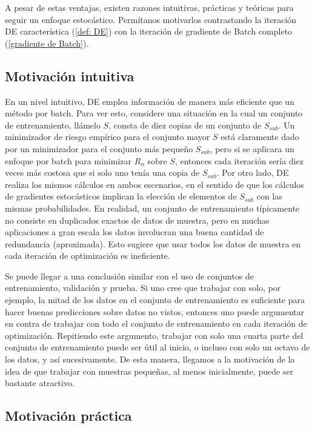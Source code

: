 	A pesar de estas ventajas, existen razones intuitivas, pr\'acticas y te\'oricas para seguir un enfoque estoc\'astico. Perm\'itanos motivarlos contrastando la iteraci\'on DE caracter\'istica (\ref{def: DE}) con la iteraci\'on de gradiente de Batch completo (\ref{gradiente de Batch}).
	
	\subsection{Motivación intuitiva}
	
	En un nivel intuitivo, DE emplea información de manera más eficiente que un método por batch. Para ver esto, considere una situación en la cual un conjunto de entrenamiento, llámelo $S$, consta de diez copias de un conjunto de $S_{sub}$. Un minimizador de riesgo empírico para el conjunto mayor $S$ está claramente dado por un minimizador para el conjunto más pequeño $S_{sub}$, pero si se aplicara un enfoque por batch para minimizar $R_n$ sobre $S$, entonces cada iteración sería diez veces más costosa que si solo uno tenía una copia de $S_{sub}$. Por otro lado, DE realiza los mismos cálculos en ambos escenarios, en el sentido de que los cálculos de gradientes estocásticos implican la elección de elementos de $S_{sub}$ con las mismas probabilidades. En realidad, un conjunto de entrenamiento típicamente no consiste en duplicados exactos de datos de muestra, pero en muchas aplicaciones a gran escala los datos involucran una buena cantidad de redundancia (aproximada). Esto sugiere que usar todos los datos de muestra en cada iteración de optimización es ineficiente.
	
	Se puede llegar a una conclusión similar con el uso de conjuntos de entrenamiento, validación y prueba. Si uno cree que trabajar con solo, por ejemplo, la mitad de los datos en el conjunto de entrenamiento  es suficiente para hacer buenas predicciones sobre datos no vistos, entonces uno puede argumentar en contra de trabajar con todo el conjunto de entrenamiento en cada iteración de optimización. Repitiendo este argumento, trabajar con solo una cuarta parte del conjunto de entrenamiento puede ser útil al inicio, o incluso con solo un octavo de los datos, y así sucesivamente. De esta manera, llegamos a la motivación de la idea de que trabajar con muestras pequeñas, al menos inicialmente, puede ser bastante atractivo.
	
	\subsection{Motivación práctica}
	
